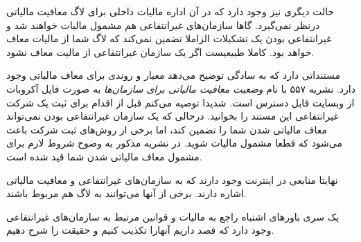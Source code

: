 حالت دیگری نیز وجود دارد که در آن اداره مالیات داخلی  برای لاگ
معافیت مالیاتی درنظر نمی‌گیرد. گاها سازمان‌های غیرانتفاعی هم مشمول مالیات
خواهند شد و غیرانتفاعی بودن یک تشکیلات الزاملا تضمین نمی‌کند که لاگ شما از مالیات
معاف خواهد بود. کاملا طبیعیست اگر یک سازمان غیرانتفاعی از مالیت معاف نشود.

مستنداتی دارد که به سادگی توضیح می‌دهد معیار و روندی برای
معاف مالیاتی وجود دارد.
نشریه ۵۵۷ با نام
{\itshape وضعیت معافیت مالیاتی برای سازمان‌ها}
به صورت فایل آکروبات از وبسایت  قابل دسترس است.
شدیدا توصیه می‌کنم قبل از اقدام برای ثبت یک شرکت غیرانتفاعی
این مستند را بخوانید.
درحالی که یک سازمان غیرانتفاعی بودن نمی‌تواند معاف مالیاتی شدن
شما را تضمین کند، اما برخی از روش‌های ثبت شرکت باعث می‌شود که
قطعا مشمول مالیات شوید. در نشریه مذکور به وضوح شروط لازم برای
مشمول معاف مالیاتی شدن شما قید شده است.


نهایتا منابعی در اینترنت وجود دارند که به سازمان‌های غیرانتفاعی و معافیت مالیاتی
اشاره دارند. برخی از آنها می‌توانند به لاگ هم مربوط باشند.

یک سری باورهای اشتباه راجع به مالیات و قوانین مرتبط به سازمان‌های غیرانتفاعی
وجود دارد که قصد داریم آنهارا تکذیب کنیم و حقیقت را شرح دهیم.



